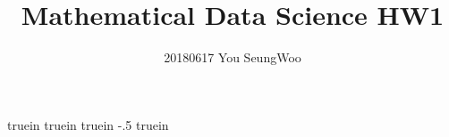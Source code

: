 truein 
 truein 
 truein 
\topmargin -.5 truein 
\textheight 8.5in
\hypersetup{
	colorlinks=true,
	linkcolor=red,
	filecolor=magenta,      
	urlcolor=cyan,
}


\title{Mathematical Data Science HW1}
\author{20180617 You SeungWoo}